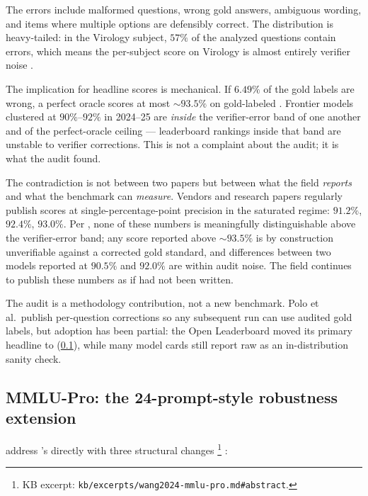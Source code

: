 The errors include malformed questions, wrong gold answers, ambiguous
wording, and items where multiple options are defensibly correct. The
distribution is heavy-tailed: in the Virology subject, $57\%$ of the
analyzed questions contain errors, which means the per-subject score
on Virology is almost entirely verifier noise
\citep[\S{}abstract]{mmlu-redux-2024}.

The implication for headline scores is mechanical. If $6.49\%$ of the
gold labels are wrong, a perfect oracle scores at most
$\sim 93.5\%$ on gold-labeled . Frontier models clustered at
$90\%\text{--}92\%$ in 2024--25 are \emph{inside} the verifier-error
band of one another and of the perfect-oracle ceiling --- leaderboard
rankings inside that band are unstable to verifier corrections. This
is not a complaint about the audit; it is what the audit found.

\begin{contradiction}
The contradiction is not between two papers but between what the field
\emph{reports} and what the benchmark can \emph{measure}. Vendors and
research papers regularly publish  scores at single-percentage-point
precision in the saturated regime: \(91.2\%\), \(92.4\%\), \(93.0\%\).
Per \citet{mmlu-redux-2024}, none of these numbers is meaningfully
distinguishable above the verifier-error band; any score reported
above $\sim 93.5\%$ is by construction unverifiable against a corrected
gold standard, and differences between two models reported at $90.5\%$
and $92.0\%$ are within audit noise. The field continues to publish
these numbers as if  had not been written.
\end{contradiction}

The audit is a methodology contribution, not a new benchmark. Polo et
al.\ publish per-question corrections so any subsequent run can use
audited gold labels, but adoption has been partial: the Open 
Leaderboard moved its primary headline to 
(\cref{sec:knowledge-mmlu-pro}), while many model cards still report
raw  as an in-distribution sanity check.

\subsection{MMLU-Pro: the 24-prompt-style robustness extension}
\label{sec:knowledge-mmlu-pro}

\citet{wang2024-mmlu-pro} address 's  directly with three
structural changes%
\footnote{KB excerpt: \nolinkurl{kb/excerpts/wang2024-mmlu-pro.md#abstract}.}
\citep[\S{}abstract]{wang2024-mmlu-pro}:


